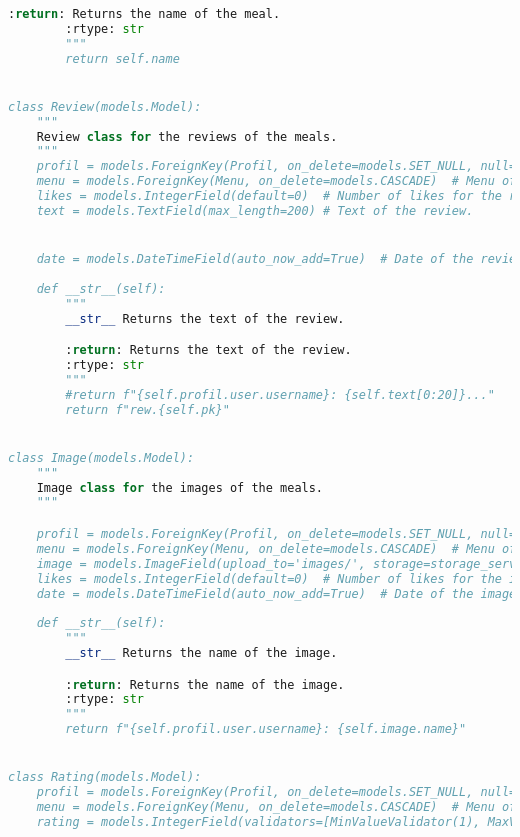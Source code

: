\begin{lstlisting}[language=Python]
        :return: Returns the name of the meal.
        :rtype: str
        """
        return self.name


class Review(models.Model):
    """
    Review class for the reviews of the meals.
    """
    profil = models.ForeignKey(Profil, on_delete=models.SET_NULL, null=True)  # Profil of the user who wrote the review. -> If the user doesn't exist anymore, the review is still there.
    menu = models.ForeignKey(Menu, on_delete=models.CASCADE)  # Menu of the meal the review is about. -> If the meal doesn't exist anymore, the review is deleted.
    likes = models.IntegerField(default=0)  # Number of likes for the review.
    text = models.TextField(max_length=200) # Text of the review.


    date = models.DateTimeField(auto_now_add=True)  # Date of the review. Default is the current date.
    
    def __str__(self):
        """
        __str__ Returns the text of the review.

        :return: Returns the text of the review.
        :rtype: str
        """
        #return f"{self.profil.user.username}: {self.text[0:20]}..."
        return f"rew.{self.pk}"


class Image(models.Model):
    """
    Image class for the images of the meals.
    """

    profil = models.ForeignKey(Profil, on_delete=models.SET_NULL, null=True)  # Profil of the user who uploaded the image. -> If the user doesn't exist anymore, the image is still there.
    menu = models.ForeignKey(Menu, on_delete=models.CASCADE)  # Menu of the meal the image is about. -> If the meal doesn't exist anymore, the image is deleted.
    image = models.ImageField(upload_to='images/', storage=storage_service)  # Image of the meal.
    likes = models.IntegerField(default=0)  # Number of likes for the image.
    date = models.DateTimeField(auto_now_add=True)  # Date of the image. Default is the current date.
    
    def __str__(self):
        """
        __str__ Returns the name of the image.

        :return: Returns the name of the image.
        :rtype: str
        """
        return f"{self.profil.user.username}: {self.image.name}"


class Rating(models.Model):
    profil = models.ForeignKey(Profil, on_delete=models.SET_NULL, null=True)  # Profil of the user who rated the meal. -> If the user doesn't exist anymore, the rating is still there.
    menu = models.ForeignKey(Menu, on_delete=models.CASCADE)  # Menu of the meal the rating is about. -> If the meal doesn't exist anymore, the rating is deleted.
    rating = models.IntegerField(validators=[MinValueValidator(1), MaxValueValidator(5)], default=1)  # Rating of the meal.



\end{lstlisting}
